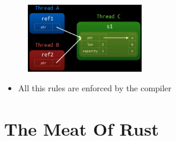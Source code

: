 \documentclass{report}
\begin{document}
\begin{multicols*}{2}
\begin{figure}[H] 
	 \centering 
	 \includegraphics[width=2in]{screenshots/2022-07-16T21-38-55Z.png} 
 \end{figure}

\begin{itemize}
  \item All this rules are enforced by the compiler 
\end{itemize}


\end{multicols*}


\chapter{The Meat Of Rust}
\end{document}
